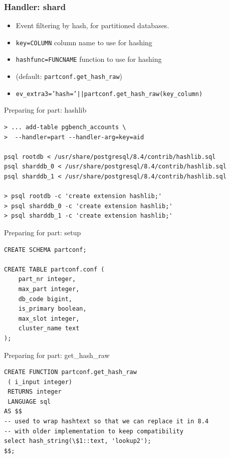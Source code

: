 \documentclass{beamer}
\begin{document}
\begin{frame}[fragile]
  \frametitle{Handler: shard}

  \begin{itemize}
    \item Event filtering by hash, for partitioned databases.
    \item \texttt{key=COLUMN} column name to use for hashing
    \item \texttt{hashfunc=FUNCNAME} function to use for hashing
    \item (default: \texttt{partconf.get\_hash\_raw})
    \item \texttt{ev\_extra3='hash='||partconf.get\_hash\_raw(key\_column)}
  \end{itemize}
\end{frame}

\begin{frame}[fragile]{Preparing for part: hashlib}
\begin{verbatim}
> ... add-table pgbench_accounts \
>  --handler=part --handler-arg=key=aid

psql rootdb < /usr/share/postgresql/8.4/contrib/hashlib.sql 
psql sharddb_0 < /usr/share/postgresql/8.4/contrib/hashlib.sql 
psql sharddb_1 < /usr/share/postgresql/8.4/contrib/hashlib.sql 

> psql rootdb -c 'create extension hashlib;'
> psql sharddb_0 -c 'create extension hashlib;'
> psql sharddb_1 -c 'create extension hashlib;'
\end{verbatim}
\end{frame}

\begin{frame}[fragile]{Preparing for part: setup}
\begin{verbatim}
CREATE SCHEMA partconf;

CREATE TABLE partconf.conf (
    part_nr integer,
    max_part integer,
    db_code bigint,
    is_primary boolean,
    max_slot integer,
    cluster_name text
);
\end{verbatim}
\end{frame}

\begin{frame}[fragile]{Preparing for part: get\_hash\_raw}
\begin{verbatim}
CREATE FUNCTION partconf.get_hash_raw
 ( i_input integer)
 RETURNS integer
 LANGUAGE sql
AS $$
-- used to wrap hashtext so that we can replace it in 8.4
-- with older implementation to keep compatibility
select hash_string(\$1::text, 'lookup2');
$$;
\end{verbatim}
\end{frame}
\end{document}
